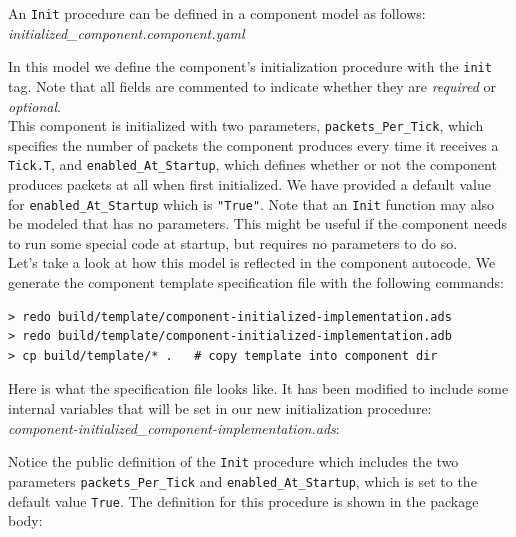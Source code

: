 An \texttt{Init} procedure can be defined in a component model as follows: \\

\textit{initialized\_component.component.yaml}

In this model we define the component's initialization procedure with the \texttt{init} tag. Note that all fields are commented to indicate whether they are \textit{required} or \textit{optional}. \\

This component is initialized with two parameters, \texttt{packets\_Per\_Tick}, which specifies the number of packets the component produces every time it receives a \texttt{Tick.T}, and \texttt{enabled\_At\_Startup}, which defines whether or not the component produces packets at all when first initialized. We have provided a default value for \texttt{enabled\_At\_Startup} which is \texttt{"True"}. Note that an \texttt{Init} function may also be modeled that has no parameters. This might be useful if the component needs to run some special code at startup, but requires no parameters to do so. \\

Let's take a look at how this model is reflected in the component autocode. We generate the component template specification file with the following commands:

\vspace{5mm} %
\begin{verbatim}
> redo build/template/component-initialized-implementation.ads
> redo build/template/component-initialized-implementation.adb
> cp build/template/* .   # copy template into component dir
\end{verbatim}
\vspace{5mm} %

Here is what the specification file looks like. It has been modified to include some internal variables that will be set in our new initialization procedure: \\

\textit{component-initialized\_component-implementation.ads}:

Notice the public definition of the \texttt{Init} procedure which includes the two parameters \texttt{packets\_Per\_Tick} and \texttt{enabled\_At\_Startup}, which is set to the default value \texttt{True}. The definition for this procedure is shown in the package body: \\

